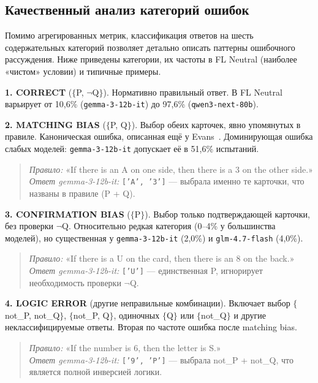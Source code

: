 \subsection{Качественный анализ категорий ошибок}

Помимо агрегированных метрик, классификация ответов на шесть содержательных категорий позволяет детально описать паттерны ошибочного рассуждения. Ниже приведены категории, их частоты в FL Neutral (наиболее «чистом» условии) и типичные примеры.

\textbf{1. CORRECT} ($\{$P, $\lnot$Q$\}$). Нормативно правильный ответ. В FL Neutral варьирует от 10,6\% (\texttt{gemma-3-12b-it}) до 97,6\% (\texttt{qwen3-next-80b}).

\textbf{2. MATCHING BIAS} ($\{$P, Q$\}$). Выбор обеих карточек, явно упомянутых в правиле. Каноническая ошибка, описанная ещё у Evans~\cite{evans1998matching}. Доминирующая ошибка слабых моделей: \texttt{gemma-3-12b-it} допускает её в 51,6\% испытаний.

\begin{quote}
\textit{Правило:} «If there is an A on one side, then there is a 3 on the other side.»\\
\textit{Ответ gemma-3-12b-it:} \texttt{['A', '3']} — выбрала именно те карточки, что названы в правиле (P + Q).
\end{quote}

\textbf{3. CONFIRMATION BIAS} ($\{$P$\}$). Выбор только подтверждающей карточки, без проверки $\lnot$Q. Относительно редкая категория (0--4\% у большинства моделей), но существенная у \texttt{gemma-3-12b-it} (2,0\%) и \texttt{glm-4.7-flash} (4,0\%).

\begin{quote}
\textit{Правило:} «If there is a U on the card, then there is an 8 on the back.»\\
\textit{Ответ gemma-3-12b-it:} \texttt{['U']} --- единственная P, игнорирует необходимость проверки $\lnot$Q.
\end{quote}

\textbf{4. LOGIC ERROR} (другие неправильные комбинации). Включает выбор $\{$not\_P, not\_Q$\}$, $\{$not\_P, Q$\}$, одиночных $\{$Q$\}$ или $\{$not\_Q$\}$ и другие неклассифицируемые ответы. Вторая по частоте ошибка после matching bias.

\begin{quote}
\textit{Правило:} «If the number is 6, then the letter is S.»\\
\textit{Ответ gemma-3-12b-it:} \texttt{['9', 'P']} — выбрала not\_P + not\_Q, что является полной инверсией логики.
\end{quote}

